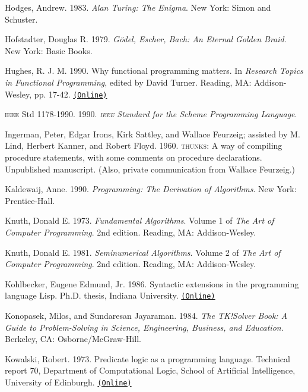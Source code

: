 \documentclass[oneside]{book}
\newcommand{\acronym}[1]{\textsc{\MakeLowercase{#1}}}
\newcommand{\code}[1]{\texttt{#1}}
\begin{document}
 \label{Hodges 1983}
Hodges, Andrew. 1983.  \textit{Alan Turing: The Enigma}. New York: Simon and
Schuster.

 \label{Hofstadter 1979}
Hofstadter, Douglas R.  1979.  \textit{G\"odel, Escher, Bach: An Eternal Golden
Braid}. New York: Basic Books.

 \label{Hughes 1990}
Hughes, R. J. M.  1990.  Why functional programming matters.  In \textit{Research
Topics in Functional Programming}, edited by David Turner.  Reading, MA:
Addison-Wesley, pp. 17-42.
\href{http://www.cs.kent.ac.uk/people/staff/dat/miranda/whyfp90.pdf}{\code{(Online)}}

 \label{IEEE 1990}
\acronym{IEEE} Std 1178-1990.  1990.  \textit{\acronym{IEEE} Standard for the
Scheme Programming Language}.

 \label{Ingerman et al. 1960}
Ingerman, Peter, Edgar Irons, Kirk Sattley, and Wallace Feurzeig; assisted by
M. Lind, Herbert Kanner, and Robert Floyd.  1960.  \acronym{THUNKS}: A way of
compiling procedure statements, with some comments on procedure declarations.
Unpublished manuscript.  (Also, private communication from Wallace Feurzeig.)

 \label{Kaldewaij 1990}
Kaldewaij, Anne. 1990.  \textit{Programming: The Derivation of Algorithms}. New
York: Prentice-Hall.

 \label{Knuth (1973)}
Knuth, Donald E.  1973.  \textit{Fundamental Algorithms}. Volume 1 of \textit{The
Art of Computer Programming}.  2nd edition. Reading, MA: Addison-Wesley.

 \label{Knuth 1981}
Knuth, Donald E.  1981.  \textit{Seminumerical Algorithms}. Volume 2 of \textit{The
Art of Computer Programming}.  2nd edition. Reading, MA: Addison-Wesley.

 \label{Kohlbecker 1986}
Kohlbecker, Eugene Edmund, Jr. 1986.  Syntactic extensions in the programming
language Lisp.  Ph.D. thesis, Indiana University.
\href{http://www.ccs.neu.edu/scheme/pubs/dissertation-kohlbecker.pdf}{\code{(Online)}}

 \label{Konopasek and Jayaraman 1984}
Konopasek, Milos, and Sundaresan Jayaraman.  1984.  \textit{The TK!Solver Book: A
Guide to Problem-Solving in Science, Engineering, Business, and
Education}. Berkeley, CA: Osborne/McGraw-Hill.

 \label{Kowalski (1973; 1979)}
Kowalski, Robert.  1973.  Predicate logic as a programming language.  Technical
report 70, Department of Computational Logic, School of Artificial
Intelligence, University of Edinburgh.
\href{http://www.doc.ic.ac.uk/~rak/papers/IFIP\%2074.pdf}{\code{(Online)}}
\end{document}
